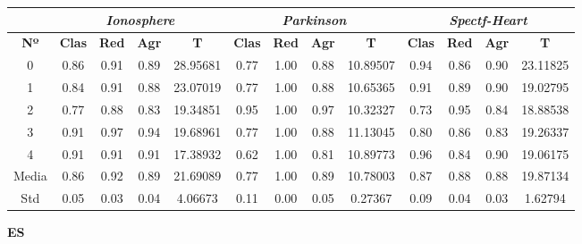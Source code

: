 \documentclass[10pt, a4paper]{article}
\theoremstyle{theorem-style}
\theoremstyle{theorem-style}
\theoremstyle{theorem2-style}
\theoremstyle{definition-style}
\theoremstyle{remark-style}
\theoremstyle{example-style}
\theoremstyle{definition-style}
\theoremstyle{remark-style}
\theoremstyle{remark-style}
\begin{document}
\begin{table}[ht!]
\begin{tabular}{ccccc|cccc|cccc}
\centering
 & \multicolumn{4}{c}{\textit{Ionosphere}} & \multicolumn{4}{c}{\textit{Parkinson}} & \multicolumn{4}{c}{\textit{Spectf-Heart}} \\ \hline
\textbf{Nº} & \textbf{Clas} & \textbf{Red} & \textbf{Agr} & \textbf{T} & \textbf{Clas} & \textbf{Red} & \textbf{Agr} & \textbf{T} & \textbf{Clas} & \textbf{Red} & \textbf{Agr} & \textbf{T} \\ \hline
0&	 0.86 & 0.91 & 0.89 & 28.95681 & 	0.77 & 1.00 & 0.88 & 10.89507 & 0.94 & 0.86 & 0.90 & 23.11825 \\ 
1&	 0.84 & 0.91 & 0.88 & 23.07019 & 	0.77 & 1.00 & 0.88 & 10.65365 & 0.91 & 0.89 & 0.90 & 19.02795 \\ 
2&	 0.77 & 0.88 & 0.83 & 19.34851 & 	0.95 & 1.00 & 0.97 & 10.32327 & 0.73 & 0.95 & 0.84 & 18.88538 \\ 
3&	 0.91 & 0.97 & 0.94 & 19.68961 & 	0.77 & 1.00 & 0.88 & 11.13045 & 0.80 & 0.86 & 0.83 & 19.26337 \\ 
4&	 0.91 & 0.91 & 0.91 & 17.38932 & 	0.62 & 1.00 & 0.81 & 10.89773 & 0.96 & 0.84 & 0.90 & 19.06175 \\ 
\hline
Media&	 0.86 & 0.92 & 0.89 & 21.69089	& 0.77 & 1.00 & 0.89 & 10.78003	&	0.87 & 0.88 & 0.88 & 19.87134
 \\ Std&	 0.05 & 0.03 & 0.04 & 4.06673&	0.11 & 0.00 & 0.05 & 0.27367	&	0.09 & 0.04 & 0.03 & 1.62794
 \\ 
\end{tabular}
\end{table}

\textbf{ES}
\end{document}
